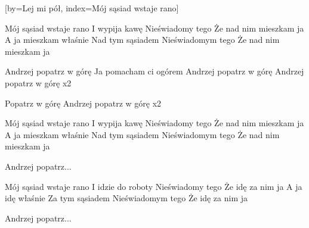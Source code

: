 [by={Lej mi pół},
                     index={Mój sąsiad wstaje rano}]
\beginverse

Mój sąsiad wstaje rano
I wypija kawę
Nieświadomy tego
Że nad nim mieszkam ja
A ja mieszkam właśnie
Nad tym sąsiadem
Nieświadomym tego
Że nad nim mieszkam ja

\endverse
\beginverse

Andrzej popatrz w górę
Ja pomacham ci ogórem
Andrzej popatrz w górę
Andrzej popatrz w górę x2

\endverse
\beginverse

Popatrz w górę
Andrzej popatrz w górę x2

\endverse
\beginverse

Mój sąsiad wstaje rano
I wypija kawę
Nieświadomy tego
Że nad nim mieszkam ja
A ja mieszkam właśnie
Nad tym sąsiadem
Nieświadomym tego
Że nad nim mieszkam ja

\endverse
\beginverse

Andrzej popatrz...

\endverse
\beginverse

Mój sąsiad wstaje rano
I idzie do roboty
Nieświadomy tego
Że idę za nim ja
A ja idę właśnie
Za tym sąsiadem
Nieświadomym tego
Że idę za nim ja

\endverse
\beginverse

Andrzej popatrz...

\endverse
\endsong